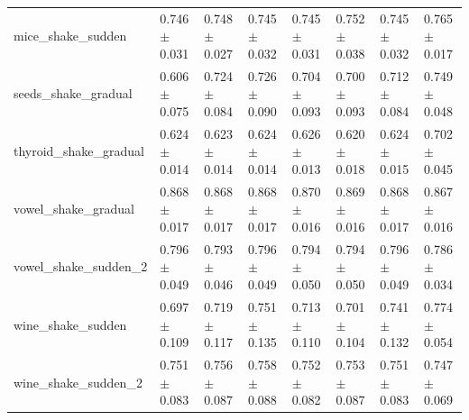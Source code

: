 \begin{tabular}{llllllll}
mice_shake_sudden & 0.746 $\pm$ 0.031 & 0.748 $\pm$ 0.027 & 0.745 $\pm$ 0.032 & 0.745 $\pm$ 0.031 & 0.752 $\pm$ 0.038 & 0.745 $\pm$ 0.032 & 0.765 $\pm$ 0.017 \\
seeds_shake_gradual & 0.606 $\pm$ 0.075 & 0.724 $\pm$ 0.084 & 0.726 $\pm$ 0.090 & 0.704 $\pm$ 0.093 & 0.700 $\pm$ 0.093 & 0.712 $\pm$ 0.084 & 0.749 $\pm$ 0.048 \\
thyroid_shake_gradual & 0.624 $\pm$ 0.014 & 0.623 $\pm$ 0.014 & 0.624 $\pm$ 0.014 & 0.626 $\pm$ 0.013 & 0.620 $\pm$ 0.018 & 0.624 $\pm$ 0.015 & 0.702 $\pm$ 0.045 \\
vowel_shake_gradual & 0.868 $\pm$ 0.017 & 0.868 $\pm$ 0.017 & 0.868 $\pm$ 0.017 & 0.870 $\pm$ 0.016 & 0.869 $\pm$ 0.016 & 0.868 $\pm$ 0.017 & 0.867 $\pm$ 0.016 \\
vowel_shake_sudden_2 & 0.796 $\pm$ 0.049 & 0.793 $\pm$ 0.046 & 0.796 $\pm$ 0.049 & 0.794 $\pm$ 0.050 & 0.794 $\pm$ 0.050 & 0.796 $\pm$ 0.049 & 0.786 $\pm$ 0.034 \\
wine_shake_sudden & 0.697 $\pm$ 0.109 & 0.719 $\pm$ 0.117 & 0.751 $\pm$ 0.135 & 0.713 $\pm$ 0.110 & 0.701 $\pm$ 0.104 & 0.741 $\pm$ 0.132 & 0.774 $\pm$ 0.054 \\
wine_shake_sudden_2 & 0.751 $\pm$ 0.083 & 0.756 $\pm$ 0.087 & 0.758 $\pm$ 0.088 & 0.752 $\pm$ 0.082 & 0.753 $\pm$ 0.087 & 0.751 $\pm$ 0.083 & 0.747 $\pm$ 0.069 \\
\bottomrule
\end{tabular}
